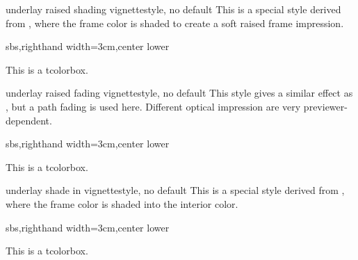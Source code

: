 \clearpage
\begin{docTcbKey}[][doc new=2016-04-22]{underlay raised shading vignette}{}{style, no default}
  This is a special style derived from ,
  where the frame color is shaded to create a soft raised frame impression.

\begin{dispExample*}{sbs,righthand width=3cm,center lower}
\begin{tcolorbox}[enhanced,sharp corners,
  colback=green!10,
  colframe=green!50!black,
  size=small,boxrule=2mm,titlerule=0mm,
  title=My title,center title,fonttitle=\bfseries,
  underlay raised shading vignette]
    This is a tcolorbox.
\end{tcolorbox}
\end{dispExample*}
\end{docTcbKey}



\begin{docTcbKey}[][doc new=2016-04-22]{underlay raised fading vignette}{}{style, no default}
  This style gives a similar effect as ,
  but a path fading is used here. Different optical impression are very
  previewer-dependent.
\begin{dispExample*}{sbs,righthand width=3cm,center lower}
\begin{tcolorbox}[enhanced,sharp corners,
  colback=green!10,
  colframe=green!50!black,
  size=small,boxrule=2mm,titlerule=0mm,
  title=My title,center title,fonttitle=\bfseries,
  underlay raised fading vignette]
    This is a tcolorbox.
\end{tcolorbox}
\end{dispExample*}
\end{docTcbKey}

\begin{docTcbKey}[][doc new=2016-04-22]{underlay shade in vignette}{}{style, no default}
  This is a special style derived from ,
  where the frame color is shaded into the interior color.
\begin{dispExample*}{sbs,righthand width=3cm,center lower}
\begin{tcolorbox}[enhanced,sharp corners,frame hidden,
  colback=green!10,
  colframe=green!50!black,
  size=small,boxrule=2mm,titlerule=0mm,
  underlay shade in vignette]
    This is a tcolorbox.
\end{tcolorbox}
\end{dispExample*}
\end{docTcbKey}


